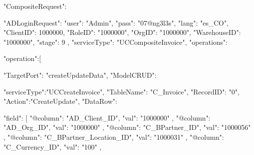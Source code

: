 {

       "CompositeRequest":{
            "ADLoginRequest": {
            "user": "Admin",
            "pass": "07@ng3l3s",
            "lang": "es_CO",
            "ClientID": 1000000,
            "RoleID": "1000000",
            "OrgID": "1000000",
            "WarehouseID": "1000000",
            "stage": 9
        },
          "serviceType": "UCCompositeInvoice",
              "operations":{
                  "operation":[
                      {
                      "TargetPort": "createUpdateData",
                      "ModelCRUD": {
                          "serviceType":"UCCreateInvoice",
                          "TableName": "C_Invoice",
                          "RecordID": "0",
                          "Action":"CreateUpdate",
                          "DataRow": {
                      "field": [
                    {
                        "@column": "AD_Client_ID",
                        "val": "1000000"
                    }, 
                    {
                        "@column": "AD_Org_ID",
                        "val": "1000000"
                    }, 
                    {
                        "@column": "C_BPartner_ID",
                        "val": "1000056"
                    },
                      {
                        "@column": "C_BPartner_Location_ID",
                        "val": "1000031"
                    }, 
                       {
                        "@column": "C_Currency_ID",
                        "val": "100"
                    }, 

}}}}}}
